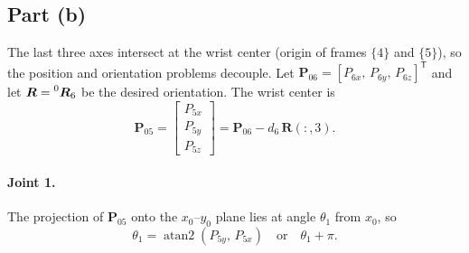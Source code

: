 \documentclass[11pt]{article}
\newcommand{\R}{\bm{R}}
\newcommand{\framen}[1]{\{#1\}}
\newcommand{\atantwo}{\operatorname{atan2}}
\begin{document}
\subsection*{Part (b)}
The last three axes intersect at the wrist center (origin of frames $\framen{4}$ and $\framen{5}$), so the position and orientation problems decouple.
Let $\bm{P}_{06}=[P_{6x},\,P_{6y},\,P_{6z}]^{\mathsf T}$ and let $\R=\prescript{0}{}{\R}_6$ be the desired orientation. The wrist center is
\begin{equation}
\bm{P}_{05} = \begin{bmatrix}P_{5x}\\P_{5y}\\P_{5z}\end{bmatrix} = \bm{P}_{06} - d_6\,\R(:,3).
\end{equation}

\paragraph{Joint 1.} The projection of $\bm{P}_{05}$ onto the $x_0$--$y_0$ plane lies at angle $\theta_1$ from $x_0$, so
\begin{equation}
\theta_1 = \atantwo\!\left(P_{5y},\,P_{5x}\right) \quad\text{or}\quad \theta_1+\pi.
\end{equation}
\end{document}
